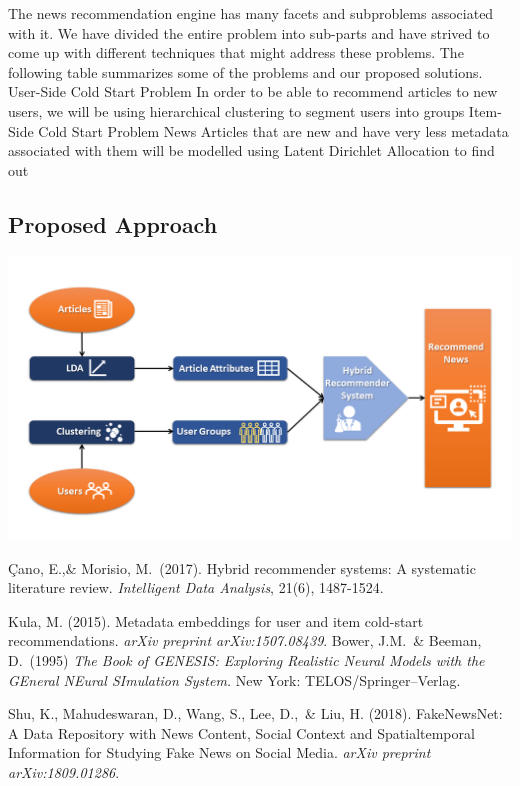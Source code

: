 \documentclass{article}
\begin{document}
The news recommendation engine has many facets and subproblems associated with it. We have divided the entire problem into sub-parts and have strived to come up with different techniques that might address these problems. 
The following table summarizes some of the problems and our proposed solutions. 
User-Side Cold Start Problem
In order to be able to recommend articles to new users, we will be using hierarchical clustering to segment users into groups  
Item-Side Cold Start Problem
News Articles that are new and have very less metadata associated with them will be modelled using Latent Dirichlet Allocation to find out 


\subsection{Proposed Approach}
\includegraphics[scale=.50]{NeuRIPS2019/Slide1.PNG}

\begin{thebibliography}{9}

 Çano, E.,\& Morisio, M.\ (2017). Hybrid recommender systems: A systematic literature review. {\it Intelligent Data Analysis}, 21(6), 1487-1524.

 Kula, M. (2015). Metadata embeddings for user and item cold-start recommendations. {\it arXiv preprint arXiv:1507.08439}.
Bower, J.M.\ \& Beeman, D.\ (1995) {\it The Book of GENESIS: Exploring
  Realistic Neural Models with the GEneral NEural SImulation System.}  New York:
TELOS/Springer--Verlag.

 Shu, K., Mahudeswaran, D., Wang, S., Lee, D.,\ \& Liu, H. (2018). FakeNewsNet: A Data Repository with News Content, Social Context and Spatialtemporal Information for Studying Fake News on Social Media. {\it arXiv preprint arXiv:1809.01286}.

\end{thebibliography}
\end{document}
